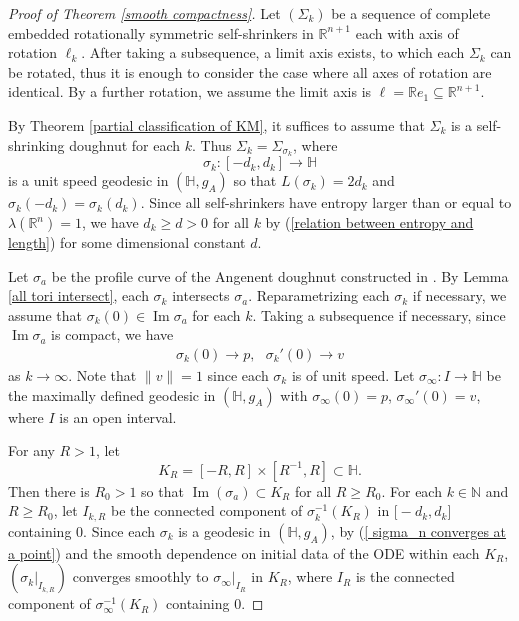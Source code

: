 \documentclass[12pt]{amsart}
\numberwithin{equation}{section}
\theoremstyle{remark}
\begin{document}
	\begin{proof} [Proof of Theorem \ref{smooth compactness}] Let $(\Sigma_k)$ be a sequence of complete embedded rotationally symmetric self-shrinkers in $\mathbb R^{n+1}$ each with axis of rotation $\ell_k$. After taking a subsequence, a limit axis exists, to which each $\Sigma_k$ can be rotated, thus it is enough to consider the case where all axes of rotation are identical. By a further rotation, we assume the limit axis is $\ell =\mathbb{R} e_1\subseteq\mathbb{R}^{n+1}$.
		
		By Theorem \ref{partial classification of KM}, it suffices to assume that $\Sigma_k$ is a self-shrinking doughnut for each $k$. Thus $\Sigma_ k =\Sigma_{\sigma_k}$, where 
		$$\sigma _k: [-d_k, d_k] \to \mathbb H$$ 
		is a unit speed geodesic in $(\mathbb H, g_A)$ so that $L(\sigma_k)= 2d_k$ and $\sigma_k(-d_k) =\sigma_k(d_k)$. Since all self-shrinkers have entropy larger than or equal to $\lambda(\mathbb R^n) =  1$, we have $d_k \ge d>0$ for all $k$ by (\ref{relation between entropy and length}) for some dimensional constant $d$.
		
		Let $\sigma_a$ be the profile curve of the Angenent doughnut constructed in \cite{Ang}. By Lemma \ref{all tori intersect}, each $\sigma_k$ intersects $\sigma_a$. Reparametrizing each $\sigma_k$ if necessary, we assume that $\sigma_k (0) \in \operatorname{Im} \sigma_a$ for each $k$. Taking a subsequence if necessary, since $\operatorname{Im}\sigma_a$ is compact, we have
		\begin{align} \label{ sigma_n converges at a point}
			\sigma_k (0) \to p, \ \ \ \sigma_k'(0)\to v
		\end{align}
		as $k\to \infty$. Note that $\|v\|=1$ since each $\sigma_k$ is of unit speed. Let $\sigma_\infty : I \to \mathbb H$ be the maximally defined geodesic in $(\mathbb H, g_A)$ with $\sigma_\infty(0) = p$, $\sigma_\infty'(0) = v$, where $I$ is an open interval.
		
		For any $R>1$, let 
		$$K_R =[-R, R] \times [R^{-1}, R]  \subset \mathbb H.$$ 
		Then there is $R_0 >1$ so that $\operatorname{Im}(\sigma_a) \subset K_R$ for all $R \ge R_0$. For each $k\in \mathbb N$ and $R\ge R_0$, let $I_{k, R}$ be the connected component of $\sigma_k^{-1} (K_R)$ in $\mathbb [-d_k, d_k]$ containing $0$. Since each $\sigma_k$ is a geodesic in $(\mathbb H, g_A)$, by (\ref{ sigma_n converges at a point}) and the smooth dependence on initial data of the ODE within each $K_R$, $(\sigma_k|_{I_{k,R}})$ converges smoothly to $\sigma_{\infty}|_{I_R}$ in $K_R$, where $I_R$ is the connected component of $\sigma_\infty^{-1}(K_R)$ containing $0$.
		

\end{proof}
\end{document}
